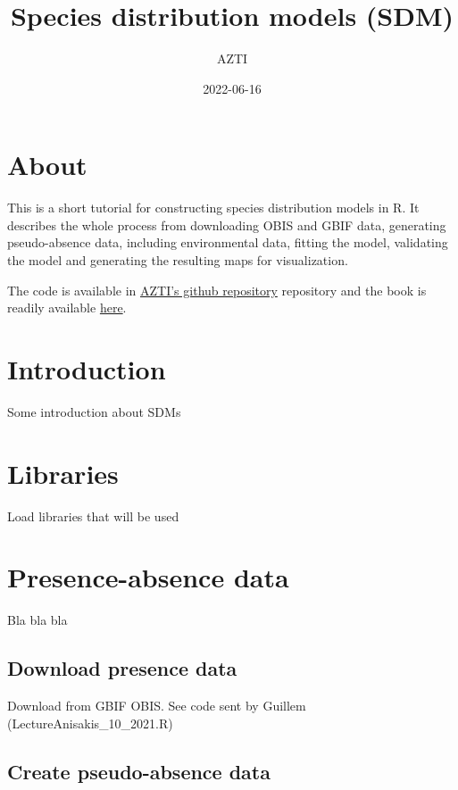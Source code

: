 \documentclass[
]{book}
\title{Species distribution models (SDM)}
\author{AZTI}
\date{2022-06-16}
\begin{document}
\maketitle

{
\setcounter{tocdepth}{1}
\tableofcontents
}
\hypertarget{about}{%
\chapter*{About}\label{about}}

This is a short tutorial for constructing species distribution models in R. It describes the whole process from downloading OBIS and GBIF data, generating pseudo-absence data, including environmental data, fitting the model, validating the model and generating the resulting maps for visualization.

The code is available in \href{https://github.com/Fundacion-AZTI/SDM}{AZTI's github repository} repository and the book is readily available \href{https://fundacion-azti.github.io/SDM/}{here}.

\hypertarget{introduction}{%
\chapter{Introduction}\label{introduction}}

Some introduction about SDMs

\hypertarget{libraries}{%
\chapter{Libraries}\label{libraries}}

Load libraries that will be used

\hypertarget{presence-absence-data}{%
\chapter{Presence-absence data}\label{presence-absence-data}}

Bla bla bla

\hypertarget{download-presence-data}{%
\section{Download presence data}\label{download-presence-data}}

Download from GBIF OBIS. See code sent by Guillem (LectureAnisakis\_10\_2021.R)

\hypertarget{create-pseudo-absence-data}{%
\section{Create pseudo-absence data}\label{create-pseudo-absence-data}}
\end{document}
